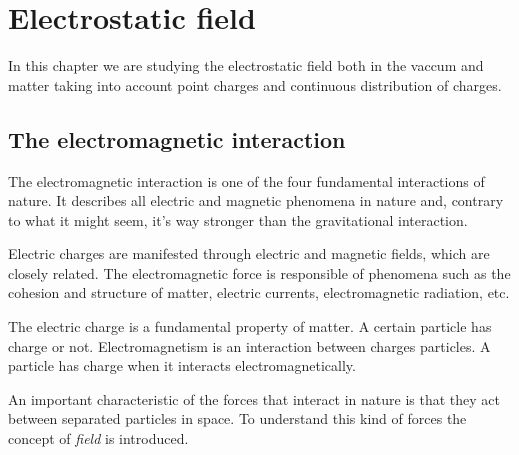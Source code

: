 \chapter{Electrostatic field}
\thispagestyle{noheaders}

In this chapter we are studying the electrostatic field both in the vaccum and matter taking into account point
charges and continuous distribution of charges.

\section{The electromagnetic interaction}
The electromagnetic interaction is one of the four fundamental interactions of nature. It describes all electric and
magnetic phenomena in nature and, contrary to what it might seem, it's way stronger than the gravitational interaction.

Electric charges are manifested through electric and magnetic fields, which are closely related. The electromagnetic force
is responsible of phenomena such as the cohesion and structure of matter, electric currents, electromagnetic radiation, etc.

\begin{defn}
    The electric charge is a fundamental property of matter. A certain particle has charge or not. Electromagnetism is an
    interaction between charges particles. A particle has charge when it interacts electromagnetically.
\end{defn}

An important characteristic of the forces that interact in nature is that they act between separated particles in
space. To understand this kind of forces the concept of \textit{field} is introduced.

